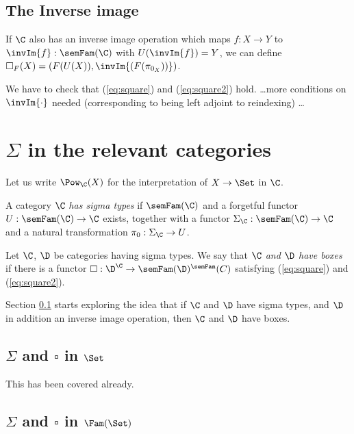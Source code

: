 \documentclass{article}
\begin{document}
\subsection{The Inverse image}
\label{inverseImage}

If $\C$ also has an inverse image operation which maps $f : X
\to Y$ to $\invIm{f} : \semFam(\C)$ with $U(\invIm{f}) = Y$, we can
define $\square_F(X) = (F(U(X)), \invIm{(F(\pi_{0_X}))})$.

We have to check that (\ref{eq:square}) and (\ref{eq:square2})
hold. \ldots more conditions on $\invIm{\cdot}$ needed (corresponding to being
left adjoint to reindexing) \ldots

\section{$\Sigma$ in the relevant categories}
Let us write $\Pow_{\C}(X)$ for the interpretation of $X \to \Set$ in
$\C$.

\begin{definition}
  A category $\C$ \emph{has sigma types} if $\semFam(\C)$ and a
  forgetful functor $U : \semFam(\C) \to \C$ exists, together with a
  functor $\Sigma_{\C} : \semFam(\C) \to \C$ and a natural
  transformation $\pi_0 : \Sigma_{\C} \to U$.
\end{definition}

\begin{definition}
  Let $\C$, $\D$ be categories having sigma types.  We say that
  \emph{$\C$ and $\D$ have boxes} if there is a functor $\square :
  \D^{\C} \to \semFam(\D)^\semFam(C)$ satisfying (\ref{eq:square}) and
  (\ref{eq:square2}).
\end{definition}

Section \ref{inverseImage} starts exploring the idea that if $\C$ and
$\D$ have sigma types, and $\D$ in addition an inverse image
operation, then $\C$ and $\D$ have boxes.

\subsection{$\Sigma$ and $\square$ in $\Set$}

This has been covered already. 

\subsection{$\Sigma$ and $\square$ in $\Fam(\Set)$}
\label{boxFamSet}
\end{document}
